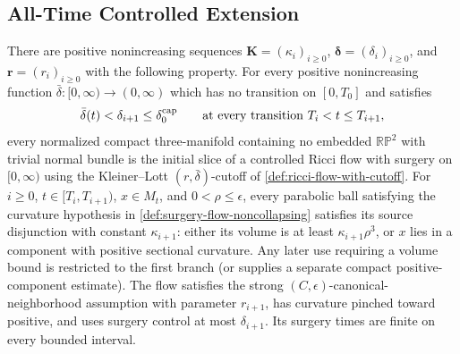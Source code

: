 \subsection{All-Time Controlled Extension}

\begin{theorem}
\label{thm:all-time-controlled-surgery-flow}
\notready
There are positive nonincreasing sequences
$\mathbf K=(\kappa_i)_{i\ge0}$,
$\boldsymbol\delta=(\delta_i)_{i\ge0}$, and
$\mathbf r=(r_i)_{i\ge0}$ with the following property.  For every positive
nonincreasing function $\bar\delta\colon[0,\infty)\to(0,\infty)$ which has
no transition on $[0,T_0]$ and satisfies
\[
\bar\delta(t)<\delta_{i+1}\le\delta_0^{\rm cap}
\qquad\text{at every transition }T_i<t\le T_{i+1},
\]
every normalized compact three-manifold containing no embedded
$\mathbb{RP}^2$ with trivial normal bundle is the initial slice of a controlled
Ricci flow with surgery on $[0,\infty)$ using the Kleiner--Lott
$(r,\bar\delta)$-cutoff of \ref{def:ricci-flow-with-cutoff}.  For
$i\ge0$, $t\in[T_i,T_{i+1})$, $x\in M_t$, and
$0<\rho\le\epsilon$, every parabolic ball satisfying the curvature hypothesis in
\ref{def:surgery-flow-noncollapsing} satisfies its source disjunction with
constant $\kappa_{i+1}$: either its volume is at least
$\kappa_{i+1}\rho^3$, or $x$ lies in a component with positive sectional
curvature.  Any later use requiring a volume bound is restricted to the first
branch (or supplies a separate compact positive-component estimate).
The flow satisfies the strong $(C,\epsilon)$-canonical-neighborhood assumption
with parameter $r_{i+1}$, has curvature pinched toward positive, and uses
surgery control at most $\delta_{i+1}$.  Its surgery times are finite on every
bounded interval.
\end{theorem}

